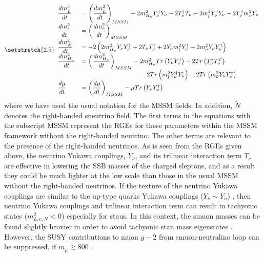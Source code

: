 \documentclass[12pt]{article}
\begin{document}
\begin{equation}
\setstretch{2.5}
\begin{array}{ll}
\dfrac{dm_{\tilde{L}}^{2}}{dt} & =\left( \dfrac{dm_{\tilde{L}}^{2}}{dt} \right)_{MSSM}-2m_{H_{u}}^{2}Y_{\nu}^{\dagger}Y_{\nu}-2T_{\nu}^{\dagger}T_{\nu}-2m_{\tilde{l}}^{2}Y_{\nu}^{\dagger}Y_{\nu} -2Y_{\nu}^{\dagger}m_{\tilde{\nu}}^{2}Y_{\nu} \\
\dfrac{dm_{\tilde{e}}^{2}}{dt} & =\left( \dfrac{dm_{\tilde{e}}^{2}}{dt} \right)_{MSSM} \\
\dfrac{dm_{\tilde{N}}^{2}}{dt} & =-2 \left( 2m_{H_{u}}^{2} Y_{\nu}Y_{\nu}^{\dagger}+2 T_{\nu}T_{\nu}^{\dagger}+2 Y_{\nu}m_{\tilde{l}}^{2}Y_{\nu}^{\dagger} +2m_{\tilde{\nu}}^{2}Y_{\nu}Y_{\nu}^{\dagger} \right) \\
\dfrac{dm_{H_{u}}^{2}}{dt}& =\left( \dfrac{dm_{H_{u}}^{2}}{dt} \right)_{MSSM}-2m_{H_{u}}^{2}Tr\left(Y_{\nu}Y_{\nu}^{\dagger}\right)-2Tr\left(T_{\nu}^{\ast}T_{\nu}^{T}\right) \\
& \hspace{3.4cm}-2Tr\left(m_{\tilde{l}}^{2}Y_{\nu}^{\dagger}Y_{\nu}\right)-2Tr\left( m_{\tilde{\nu}}^{2}Y_{\nu}Y_{\nu}^{\dagger} \right) \\
\dfrac{d\mu}{dt} & =\left( \dfrac{d\mu}{dt} \right)_{MSSM}-\mu Tr \left( Y_{\nu}Y_{\nu}^{\dagger} \right)
\end{array}
\label{RGEs}
\end{equation}
where we have used the usual notation for the MSSM fields. In addition, $\tilde{N}$ denotes the right-handed sneutrino field. The first terms in the equations with the subscript MSSM represent the RGEs for these parameters within the MSSM framework without the right-handed neutrino. The other terms are relevant to the presence of the right-handed neutrinos. As is seen from the RGEs given above, the neutrino Yukawa couplings, $Y_{\nu}$, and its trilinear interaction term $T_{\nu}$ are effective in lowering the SSB masses of the charged sleptons, and as a result they could be much lighter at the low scale than those in the usual MSSM without the right-handed neutrinos. If the texture of the neutrino Yukawa couplings are similar to the up-type quarks Yukawa couplings ($Y_{\nu}\sim Y_{u}$) \cite{Khalil:2010iu}, then neutrino Yukawa couplings and trilinear interaction term can result in tachyonic states ($m_{L,e,N}^{2} < 0$) especially for staus. In this context, the smuon masses can be found slightly heavier in order to avoid tachyonic stau mass eigenstates \cite{Gogoladze:2014vea}. However, the SUSY contributions to muon $g-2$ from smuon-neutralino loop can be suppressed, if $m_{\tilde{\mu}} \gtrsim 800$ \cite{Babu:2014lwa}.
\end{document}
